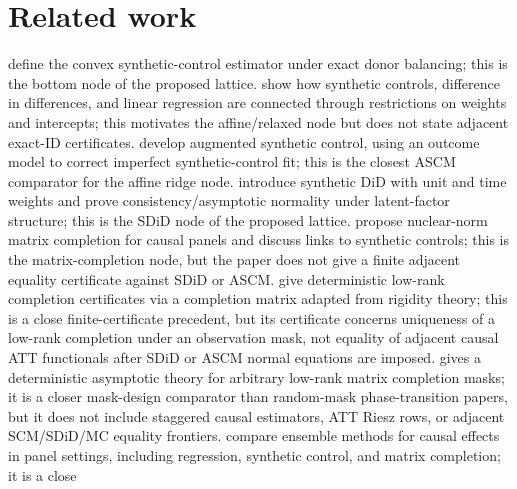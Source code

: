 \documentclass[11pt]{article}
\theoremstyle{definition}
\theoremstyle{plain}
\theoremstyle{remark}
\begin{document}
\section{Related work}
\citet[Section~2, donor-weight program]{AbadieDiamondHainmueller2010} define
the convex synthetic-control estimator under exact donor balancing; this is
the bottom node of the proposed lattice.
\citet[Sections~2--3, restriction map between SC, DID, and regression]{DoudchenkoImbens2016}
show how synthetic controls, difference in differences, and linear regression
are connected through restrictions on weights and intercepts; this motivates
the affine/relaxed node but does not state adjacent exact-ID certificates.
\citet[Sections~2--3, bias-correction formula after imperfect SC fit]{BenMichaelFellerRothstein2021}
develop augmented synthetic control, using an outcome model to correct
imperfect synthetic-control fit; this is the closest ASCM comparator for the
affine ridge node.
\citet[Section~2, unit/time weighting objective and ATT estimator]{ArkhangelskyAtheyHirshbergImbensWager2021}
introduce synthetic DiD with unit and time weights and prove
consistency/asymptotic normality under latent-factor structure; this is the
SDiD node of the proposed lattice.
\citet[Sections~2--3, nuclear-norm objective and causal-panel setup]{AtheyBayatiDoudchenkoImbensKhosravi2021}
propose nuclear-norm matrix completion for causal panels and discuss links to
synthetic controls; this is the matrix-completion node, but the paper does not
give a finite adjacent equality certificate against SDiD or ASCM.
\citet[Section~2, completion-matrix construction and local/global uniqueness tests]{SingerCucuringu2010}
give deterministic low-rank completion certificates via a completion matrix
adapted from rigidity theory; this is a close finite-certificate precedent,
but its certificate concerns uniqueness of a low-rank completion under an
observation mask, not equality of adjacent causal ATT functionals after SDiD
or ASCM normal equations are imposed.
\citet[main theorem and graph-limit solvability criterion]{Chatterjee2020}
gives a deterministic asymptotic theory for arbitrary low-rank matrix
completion masks; it is a closer mask-design comparator than random-mask
phase-transition papers, but it does not include staggered causal estimators,
ATT Riesz rows, or adjacent SCM/SDiD/MC equality frontiers.
\citet[Section~2, ensemble comparison of panel estimators]{AtheyBayatiImbensQu2019}
compare ensemble methods for causal effects in panel settings, including
regression, synthetic control, and matrix completion; it is a close
\end{document}

